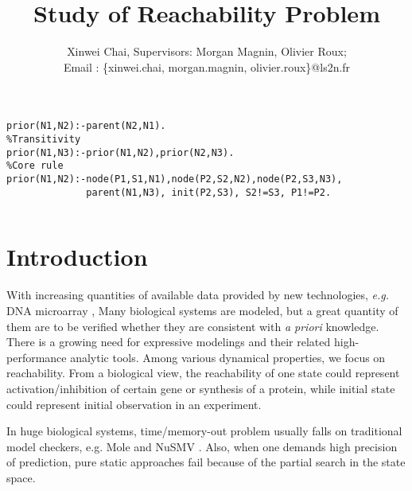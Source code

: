 \documentclass[final]{beamer}
\title{%
  \Huge{\textbf{Study of Reachability Problem}}
}
\author{%
  Xinwei Chai, Supervisors: Morgan Magnin, Olivier Roux; \texorpdfstring{\\ Email : \{xinwei.chai, morgan.magnin, olivier.roux\}@ls2n.fr}{}}
\institute{%
  Sp\'{e}cialit\'{e} : Informatique\\ %
  Laboratoire : LS2N\\         %
  \'{E}quipe : MéForBio                 %
}
\begin{document}
\newsavebox{\myLst}
\begin{lrbox}{\myLst}
\begin{lstlisting}[frame=L]
% A node appears always earlier than its predecessor
prior(N1,N2):-parent(N2,N1).
%Transitivity
prior(N1,N3):-prior(N1,N2),prior(N2,N3).
%Core rule
prior(N1,N2):-node(P1,S1,N1),node(P2,S2,N2),node(P2,S3,N3),
              parent(N1,N3), init(P2,S3), S2!=S3, P1!=P2. 
\end{lstlisting}
\end{lrbox}

\begin{frame}[t]{}

\begin{columns}[t]

\begin{column}{.45\linewidth}

\section{Introduction}
With increasing quantities of available data provided by new technologies, \textit{e.g.} DNA microarray \cite{marx2013}, Many biological systems are modeled, but a great quantity of them are to be verified whether they are consistent with \textit{a priori} knowledge. 
There is a growing need for expressive modelings and their related high-performance analytic tools. Among various dynamical properties, we focus on reachability. From a biological view, the reachability of one state could represent activation/inhibition of certain gene or synthesis of a protein, while initial state could represent initial observation in an experiment.

In huge biological systems, time/memory-out problem usually falls on traditional model checkers, e.g. Mole \cite{chatain2014characterization} and NuSMV \cite{cimatti2000nusmv}. 
Also, when one demands high precision of prediction, pure static approaches fail because of the partial search in the state space.


\end{column}
\end{columns}
\end{frame}
\end{document}
